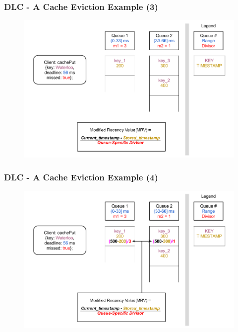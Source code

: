 \documentclass{beamer}
\begin{document}
\begin{frame}
  \frametitle{DLC - A Cache Eviction Example (3)}
  \begin{figure}
    \begin{center}
      \centerline{\includegraphics[scale=0.37]{img/DLC_V8_03.png}}
    \end{center}
  \end{figure}
\end{frame}

\begin{frame}
  \frametitle{DLC - A Cache Eviction Example (4)}
  \begin{figure}
    \begin{center}
      \centerline{\includegraphics[scale=0.37]{img/DLC_V8_04.png}}
    \end{center}
  \end{figure}
\end{frame}
\end{document}
